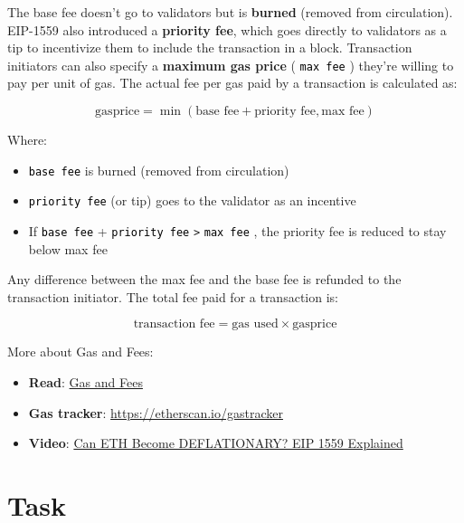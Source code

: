 \documentclass[12pt]{article}
\newcommand{\codegrey}[1]{%
  \texttt{\colorbox{black!4}{\textcolor{black}{#1}}}%
}
\begin{document}
\noindent
The base fee doesn't go to validators but is \textbf{burned} (removed from circulation). EIP-1559 also introduced a \textbf{priority fee}, which goes directly to validators as a tip to incentivize them to include the transaction in a block. Transaction initiators can also specify a \textbf{maximum gas price} (\codegrey{max fee}) they're willing to pay per unit of gas. The actual fee per gas paid by a transaction is calculated as:

\begin{equation}
\text{gasprice} = \min(\text{base fee} + \text{priority fee}, \text{max fee})
\end{equation}

Where:
\begin{itemize}
    \item \codegrey{base fee} is burned (removed from circulation)
    \item \codegrey{priority fee} (or tip) goes to the validator as an incentive
    \item If \codegrey{base fee} + \codegrey{priority fee} \verb|>| \codegrey{max fee}, the priority fee is reduced to stay below max fee
\end{itemize}

\noindent
Any difference between the max fee and the base fee is refunded to the transaction initiator. The total fee paid for a transaction is:

\begin{equation}
\text{transaction fee} = \text{gas used} \times \text{gasprice}
\end{equation}

\medskip
\noindent
More about Gas and Fees:
\begin{itemize}
  \item \textbf{Read}: \href{https://ethereum.org/en/developers/docs/gas/}{Gas and Fees}
  \item \textbf{Gas tracker}: \href{https://etherscan.io/gastracker}{https://etherscan.io/gastracker}
  \item \textbf{Video}: \href{https://www.youtube.com/watch?v=MGemhK9t44Q}{Can ETH Become DEFLATIONARY? EIP 1559 Explained}
\end{itemize}

\pagebreak
\section{Task}
\end{document}
